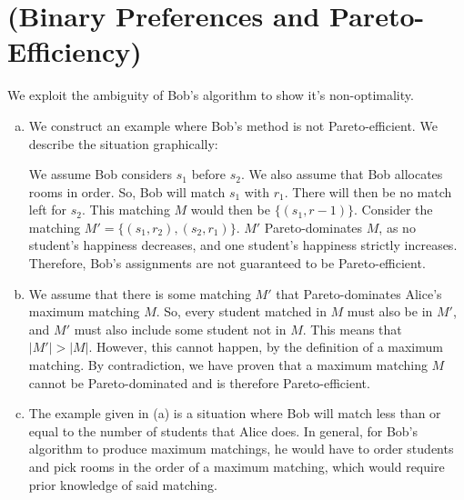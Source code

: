 \documentclass[12pt]{article}
\begin{document}
\section{(Binary Preferences and Pareto-Efficiency)}
We exploit the ambiguity of Bob's algorithm to show it's non-optimality. 
\begin{enumerate}[(a)]
\item We construct an example where Bob's method is not Pareto-efficient. We describe the situation graphically:

\begin{center}

\end{center}

We assume Bob considers $s_1$ before $s_2$. We also assume that Bob allocates rooms in order. So, Bob will match $s_1$ with $r_1$. There will then be no match left for $s_2$. This matching $M$ would then be $\{(s_1, r-1)\}$. Consider the matching $M' = \{(s_1, r_2), (s_2, r_1)\}$. $M'$ Pareto-dominates $M$, as no student's happiness decreases, and one student's happiness strictly increases. Therefore, Bob's assignments are not guaranteed to be Pareto-efficient.

\item We assume that there is some matching $M'$ that Pareto-dominates Alice's maximum matching $M$. So, every student matched in $M$ must also be in $M'$, and $M'$ must also include some student not in $M$. This means that $|M'| > |M|$. However, this cannot happen, by the definition of a maximum matching. By contradiction, we have proven that a maximum matching $M$ cannot be Pareto-dominated and is therefore Pareto-efficient.

\item The example given in (a) is a situation where Bob will match less than or equal to the number of students that Alice does. In general, for Bob's algorithm to produce maximum matchings, he would have to order students and pick rooms in the order of a maximum matching, which would require prior knowledge of said matching.
\end{enumerate}
\end{document}
